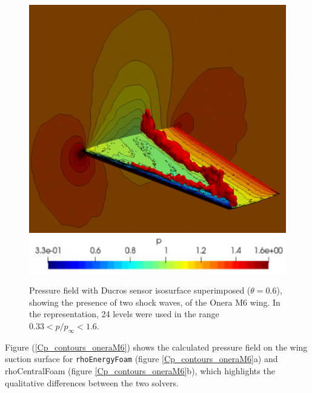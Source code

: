 \documentclass[a5paper]{sapthesis}
\begin{document}
	\begin{figure}[h]
		\centering
		{\includegraphics[width=0.7\linewidth, height=0.35\textheight]{Figures/Ducros}}  \\
		\centering
		{\includegraphics[width=0.6\linewidth]{Figures/Ducros_bar}}
		\caption[Pressure field Onera M6]{Pressure field with Ducros sensor isosurface superimposed ($\theta = 0.6$), showing the presence of two shock waves, of the Onera M6 wing. In the representation, 24 levels were used in the range  $0.33 < p/p_\infty < 1.6$.}
		\label{OneraM6_pressurefield}
	\end{figure}
	
	\noindent Figure (\ref{Cp_contours_oneraM6}) shows the calculated pressure field on the wing suction surface for \texttt{rhoEnergyFoam} (figure \ref{Cp_contours_oneraM6}a) and rhoCentralFoam (figure \ref{Cp_contours_oneraM6}b), which highlights the qualitative differences between the two solvers.
	
\end{document}
